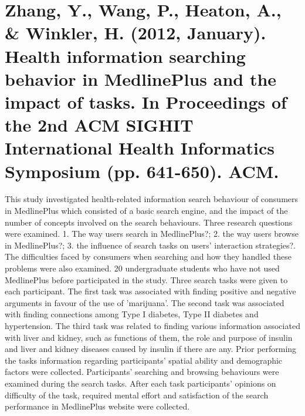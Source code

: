 \documentclass[]{article}
\begin{document}
\section{Zhang, Y., Wang, P., Heaton, A., \& Winkler, H. (2012, January). Health information searching behavior in MedlinePlus and the impact of tasks. In Proceedings of the 2nd ACM SIGHIT International Health Informatics Symposium (pp. 641-650). ACM.} 

This study investigated health-related information search behaviour of consumers in MedlinePlus which consisted of a basic search engine, and the impact of the number of concepts involved on the search behaviours. Three research  questions were examined. 1. The way users search in MedlinePlus?; 2. the way users browse in MedlinePlus?; 3. the influence of search tasks on users' interaction strategies?. The difficulties faced by consumers when searching and how they handled these problems were also examined. 20 undergraduate students who have not used MedlinePlus before participated in the study. Three search tasks were given to each participant. The first task was associated with finding positive and negative arguments in favour of the use of 'marijuana'. The second task was associated with finding connections among Type I diabetes, Type II diabetes and hypertension. The third task was related to finding various information associated with liver and kidney, such as functions of them, the role and purpose of insulin and liver and kidney diseases caused by insulin if there are any. Prior performing the tasks information regarding participants' spatial ability and demographic factors were collected. Participants' searching and browsing behaviours were examined during the search tasks. After each task participants' opinions on difficulty of the task, required mental effort and satisfaction of the search performance in MedlinePlus website were collected.                
\end{document}
